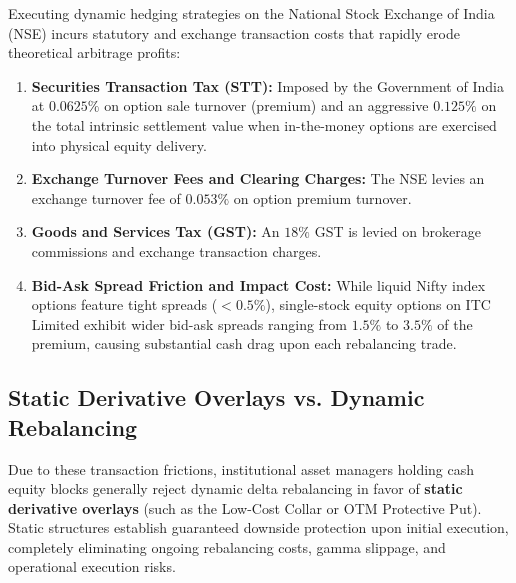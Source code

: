 Executing dynamic hedging strategies on the National Stock Exchange of India (NSE) incurs statutory and exchange transaction costs that rapidly erode theoretical arbitrage profits:
\begin{enumerate}[leftmargin=1.5em, itemsep=1pt, parsep=0pt, label=(\alph*)]
    \item \textbf{Securities Transaction Tax (STT):} Imposed by the Government of India at $0.0625\%$ on option sale turnover (premium) and an aggressive $0.125\%$ on the total intrinsic settlement value when in-the-money options are exercised into physical equity delivery.
    \item \textbf{Exchange Turnover Fees and Clearing Charges:} The NSE levies an exchange turnover fee of $0.053\%$ on option premium turnover.
    \item \textbf{Goods and Services Tax (GST):} An $18\%$ GST is levied on brokerage commissions and exchange transaction charges.
    \item \textbf{Bid-Ask Spread Friction and Impact Cost:} While liquid Nifty index options feature tight spreads ($<0.5\%$), single-stock equity options on ITC Limited exhibit wider bid-ask spreads ranging from $1.5\%$ to $3.5\%$ of the premium, causing substantial cash drag upon each rebalancing trade.
\end{enumerate}

\subsection{Static Derivative Overlays vs. Dynamic Rebalancing}

Due to these transaction frictions, institutional asset managers holding cash equity blocks generally reject dynamic delta rebalancing in favor of \textbf{static derivative overlays} (such as the Low-Cost Collar or OTM Protective Put). Static structures establish guaranteed downside protection upon initial execution, completely eliminating ongoing rebalancing costs, gamma slippage, and operational execution risks.

\clearpage
